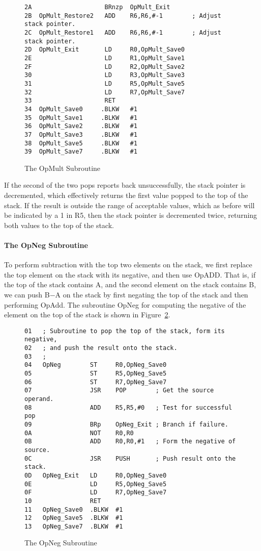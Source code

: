 \documentclass{patt}
\begin{document}
\begin{figure}
\begin{Verbatim}[fontsize=\fontsize{9}{11}\selectfont]
2A                    BRnzp  OpMult_Exit
2B  OpMult_Restore2   ADD    R6,R6,#-1        ; Adjust stack pointer.
2C  OpMult_Restore1   ADD    R6,R6,#-1        ; Adjust stack pointer.
2D  OpMult_Exit       LD     R0,OpMult_Save0
2E                    LD     R1,OpMult_Save1
2F                    LD     R2,OpMult_Save2
30                    LD     R3,OpMult_Save3
31                    LD     R5,OpMult_Save5
32                    LD     R7,OpMult_Save7
33                    RET
34  OpMult_Save0     .BLKW   #1
35  OpMult_Save1     .BLKW   #1
36  OpMult_Save2     .BLKW   #1
37  OpMult_Save3     .BLKW   #1
38  OpMult_Save5     .BLKW   #1
39  OpMult_Save7     .BLKW   #1
\end{Verbatim}
\caption{The OpMult Subroutine}
\label{fig:mul.algorithm}
\end{figure}

If the second of the two pops reports back unsuccessfully, the stack
pointer is decremented, which effectively returns the first value
popped to the top of the stack. If the result is outside the range of
acceptable values, which as before will be indicated by a 1 in R5,
then the stack pointer is decremented twice, returning both values to
the top of the stack.

\FloatBarrier
\paragraph{The OpNeg Subroutine}

To perform subtraction with the top two elements on the stack, we first
replace the top element on the stack with its negative, and then use
OpADD.  That is, if the top of the stack contains A, and
the second element on the stack contains B, we can push B$-$A on the stack
by first negating the top of the stack and then performing OpAdd.
The subroutine OpNeg for computing the negative of the element on the top of 
the stack is shown in Figure~\ref{fig:neg.algorithm}.

\begin{figure}
\begin{Verbatim}[fontsize=\fontsize{9}{11}\selectfont]
01   ; Subroutine to pop the top of the stack, form its negative,
02   ; and push the result onto the stack.
03   ;
04   OpNeg        ST     R0,OpNeg_Save0
05                ST     R5,OpNeg_Save5
06                ST     R7,OpNeg_Save7
07                JSR    POP        ; Get the source operand.
08                ADD    R5,R5,#0   ; Test for successful pop
09                BRp    OpNeg_Exit ; Branch if failure.
0A                NOT    R0,R0
0B                ADD    R0,R0,#1   ; Form the negative of source.
0C                JSR    PUSH       ; Push result onto the stack.
0D   OpNeg_Exit   LD     R0,OpNeg_Save0
0E                LD     R5,OpNeg_Save5
0F                LD     R7,OpNeg_Save7
10                RET
11   OpNeg_Save0  .BLKW  #1  
12   OpNeg_Save5  .BLKW  #1  
13   OpNeg_Save7  .BLKW  #1  
\end{Verbatim}
\caption{The OpNeg Subroutine}
\label{fig:neg.algorithm}
\end{figure}
\end{document}
